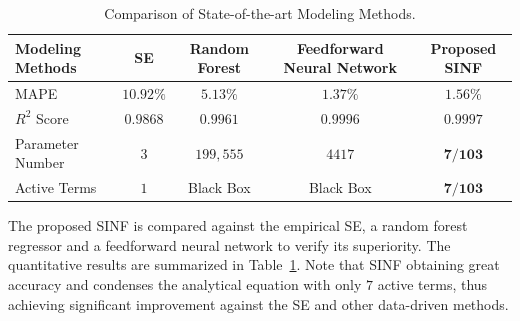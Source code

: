 \begin{table}[t!]
\centering
\caption{Comparison of State-of-the-art Modeling Methods.}
\vspace{-5pt}
\label{tab:metrics}
\renewcommand{\arraystretch}{1.3}
\begin{tabular}{lcccc}
\toprule
\rowcolor{gray!15}
Modeling Methods & SE & Random Forest & Feedforward Neural Network & \textbf{Proposed SINF}\\
\midrule
MAPE         & $10.92\%$ & $5.13\%$ & $1.37\%$ & $\mathbf{1.56\%}$  \\
$R^2$ Score  & $0.9868$  & $0.9961$ & $0.9996$ & $\mathbf{0.9997}$  \\
Parameter Number   & $3$       & $199{,}555$ & $4417$ & $\mathbf{7/103}$  \\
Active Terms & $1$       & Black Box & Black Box & $\mathbf{7/103}$  \\
\bottomrule
\end{tabular}
\end{table}

The proposed SINF is compared against the empirical SE, a random forest regressor and a feedforward neural network to verify its superiority. The quantitative results are summarized in Table~\ref{tab:metrics}. Note that SINF obtaining great accuracy and condenses the analytical equation with only $7$ active terms, thus achieving significant improvement against the SE and other data-driven methods.



